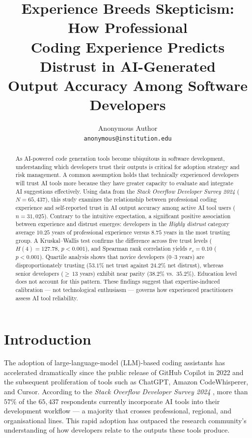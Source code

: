 \documentclass[11pt,a4paper]{article}
\title{\textbf{Experience Breeds Skepticism: How Professional\\
Coding Experience Predicts Distrust in AI-Generated\\
Output Accuracy Among Software Developers}}
\author{Anonymous Author\\
\texttt{anonymous@institution.edu}}
\date{}
\begin{document}
\maketitle
\thispagestyle{empty}

\begin{abstract}
As AI-powered code generation tools become ubiquitous in software development,
understanding which developers trust their outputs is critical for adoption
strategy and risk management. A common assumption holds that technically
experienced developers will trust AI tools more because they have greater
capacity to evaluate and integrate AI suggestions effectively. Using data from
the \emph{Stack Overflow Developer Survey 2024} ($N = 65{,}437$), this study
examines the relationship between professional coding experience and self-reported
trust in AI output accuracy among active AI tool users ($n = 31{,}025$). Contrary
to the intuitive expectation, a significant positive association between experience
and distrust emerges: developers in the \emph{Highly distrust} category average
$10.25$ years of professional experience versus $8.75$ years in the most trusting
group. A Kruskal--Wallis test confirms the difference across five trust levels
($H(4) = 127.78$, $p < 0.001$), and Spearman rank correlation yields
$r_s = 0.10$ ($p < 0.001$). Quartile analysis shows that novice developers
($0$--$3$ years) are disproportionately trusting ($53.1\%$ net trust against
$24.2\%$ net distrust), whereas senior developers (${\geq}\,13$ years) exhibit
near parity ($38.2\%$ vs.\ $35.2\%$). Education level does not account for this
pattern. These findings suggest that expertise-induced calibration --- not
technological enthusiasm --- governs how experienced practitioners assess
AI tool reliability.
\end{abstract}

\section{Introduction}
\label{sec:intro}

The adoption of large-language-model (LLM)-based coding assistants has accelerated
dramatically since the public release of GitHub Copilot in 2022 and the subsequent
proliferation of tools such as ChatGPT, Amazon CodeWhisperer, and Cursor. According
to the \emph{Stack Overflow Developer Survey 2024} \cite{stackoverflow2024}, more than
$57\%$ of the $65{,}437$ respondents currently incorporate AI tools into their
development workflow --- a majority that crosses professional, regional, and
organisational lines. This rapid adoption has outpaced the research community's
understanding of how developers relate to the outputs these tools produce.
\end{document}
